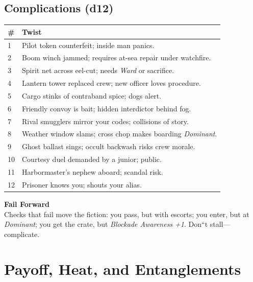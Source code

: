 \documentclass[11pt,oneside]{book}
\begin{document}
\subsection*{Complications (d12)}
\begin{tabularx}{\linewidth}{@{}p{0.7cm} X@{}}
\toprule
\# & \textbf{Twist}\\
\midrule
1 & Pilot token counterfeit; inside man panics.\\
2 & Boom winch jammed; requires at-sea repair under watchfire.\\
3 & Spirit net across eel-cut; needs \emph{Ward} or sacrifice.\\
4 & Lantern tower replaced crew; new officer loves procedure.\\
5 & Cargo stinks of contraband spice; dogs alert.\\
6 & Friendly convoy is bait; hidden interdictor behind fog.\\
7 & Rival smugglers mirror your codes; collisions of story.\\
8 & Weather window slams; cross chop makes boarding \emph{Dominant}.\\
9 & Ghost ballast sings; occult backwash risks crew morale.\\
10 & Courtesy duel demanded by a junior; public.\\
11 & Harbormaster's nephew aboard; scandal risk.\\
12 & Prisoner knows you; shouts your alias.\\
\bottomrule
\end{tabularx}

\begin{tcolorbox}[breakable]
\textbf{Fail Forward}\\
Checks that fail move the fiction: you pass, but with escorts; you enter, but at \emph{Dominant}; you get the crate, but \emph{Blockade Awareness +1}. Don``t stall---complicate.
\end{tcolorbox}

\section{Payoff, Heat, and Entanglements}
\end{document}
